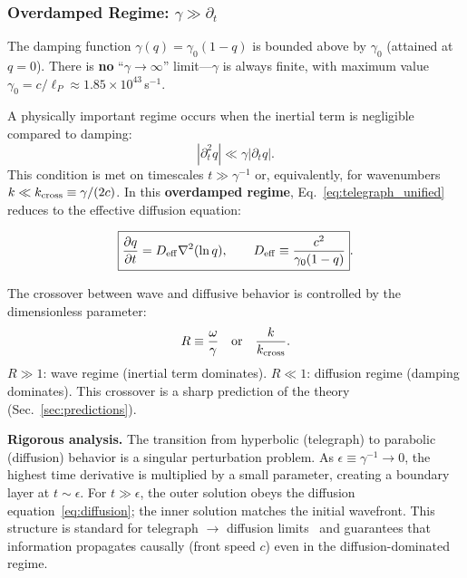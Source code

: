 \documentclass[aps,prd,twocolumn,showpacs,superscriptaddress,preprintnumbers]{revtex4-2}
\begin{document}
\subsubsection{Overdamped Regime: $\gamma\gg\partial_t$}

The damping function $\gamma(q)=\gamma_0(1-q)$ is bounded above by $\gamma_0$ (attained at $q=0$).
There is \textbf{no} ``$\gamma\to\infty$'' limit---$\gamma$ is always finite, with maximum value $\gamma_0=c/\ell_P\approx1.85\times10^{43}$\,s$^{-1}$.

A physically important regime occurs when the inertial term is negligible compared to damping:
\begin{equation}
|\partial_t^2 q| \ll \gamma|\partial_t q|.
\end{equation}
This condition is met on timescales $t\gg\gamma^{-1}$ or, equivalently, for wavenumbers $k\ll k_{\rm cross}\equiv\gamma/(2c)$.
In this \textbf{overdamped regime}, Eq.~\eqref{eq:telegraph_unified} reduces to the effective diffusion equation:

\begin{equation}
\boxed{\frac{\partial q}{\partial t} = D_{\rm eff}\nabla^2(\ln q), \qquad D_{\rm eff} \equiv \frac{c^2}{\gamma_0(1-q)}}.
\label{eq:diffusion}
\end{equation}

The crossover between wave and diffusive behavior is controlled by the dimensionless parameter:
\begin{equation}
R \equiv \frac{\omega}{\gamma} \quad\text{or}\quad \frac{k}{k_{\rm cross}}.
\end{equation}
$R\gg1$: wave regime (inertial term dominates). $R\ll1$: diffusion regime (damping dominates).
This crossover is a sharp prediction of the theory (Sec.~\ref{sec:predictions}).

\textbf{Rigorous analysis.}
The transition from hyperbolic (telegraph) to parabolic (diffusion) behavior is a singular perturbation problem.
As $\epsilon\equiv\gamma^{-1}\to0$, the highest time derivative is multiplied by a small parameter, creating a boundary layer at $t\sim\epsilon$.
For $t\gg\epsilon$, the outer solution obeys the diffusion equation~\eqref{eq:diffusion}; the inner solution matches the initial wavefront.
This structure is standard for telegraph $\to$ diffusion limits~\cite{Jou:2010} and guarantees that information propagates causally (front speed $c$) even in the diffusion-dominated regime.

\end{document}
